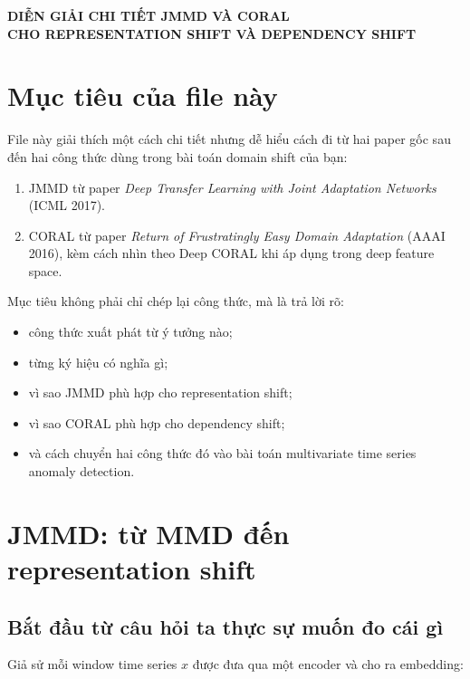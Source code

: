 \documentclass[a4paper]{article}
\begin{document}
\begin{center}
    \textbf{\Large DIỄN GIẢI CHI TIẾT JMMD VÀ CORAL}\\[0.2cm]
    \textbf{\Large CHO REPRESENTATION SHIFT VÀ DEPENDENCY SHIFT}
\end{center}

\section{Mục tiêu của file này}

File này giải thích một cách chi tiết nhưng dễ hiểu cách đi từ hai paper gốc sau đến hai công thức dùng trong bài toán domain shift của bạn:

\begin{enumerate}[label=\arabic*.]
    \item JMMD từ paper \emph{Deep Transfer Learning with Joint Adaptation Networks} (ICML 2017).
    \item CORAL từ paper \emph{Return of Frustratingly Easy Domain Adaptation} (AAAI 2016), kèm cách nhìn theo Deep CORAL khi áp dụng trong deep feature space.
\end{enumerate}

Mục tiêu không phải chỉ chép lại công thức, mà là trả lời rõ:

\begin{itemize}
    \item công thức xuất phát từ ý tưởng nào;
    \item từng ký hiệu có nghĩa gì;
    \item vì sao JMMD phù hợp cho representation shift;
    \item vì sao CORAL phù hợp cho dependency shift;
    \item và cách chuyển hai công thức đó vào bài toán multivariate time series anomaly detection.
\end{itemize}

\section{JMMD: từ MMD đến representation shift}

\subsection{Bắt đầu từ câu hỏi ta thực sự muốn đo cái gì}

Giả sử mỗi window time series $x$ được đưa qua một encoder và cho ra embedding:
\end{document}
